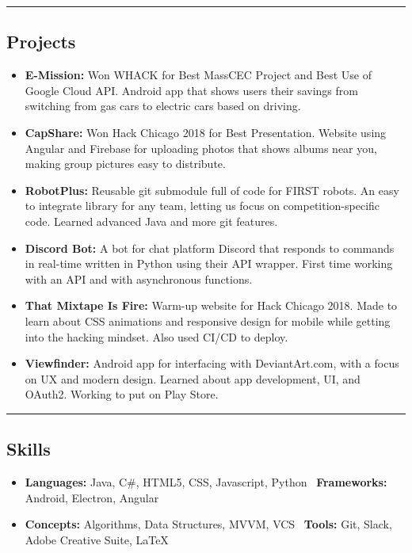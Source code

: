 \documentclass[11pt,letterpaper]{article}
\begin{document}
\hrule
\vspace{-0.4em}
\subsection*{Projects}

\begin{itemize}
	\parskip=0.1em
	
	\item \textbf{E-Mission:}
		Won WHACK for Best MassCEC Project and Best Use of Google Cloud API. Android app that shows users their savings from switching from gas cars to electric cars based on driving. 
	
	\item \textbf{CapShare:}
		Won Hack Chicago 2018 for Best Presentation. Website using Angular and Firebase for uploading photos that shows albums near you, making group pictures easy to distribute. 
		
	\item \textbf{RobotPlus:}
		Reusable git submodule full of code for FIRST robots. An easy to integrate library for any team, letting us focus on competition-specific code. Learned advanced Java and more git features. 
		
	\item \textbf{Discord Bot:}
		A bot for chat platform Discord that responds to commands in real-time written in Python using their API wrapper. First time working with an API and with asynchronous functions.
		
	\item \textbf{That Mixtape Is Fire:}
		Warm-up website for Hack Chicago 2018. Made to learn about CSS animations and responsive design for mobile while getting into the hacking mindset. Also used CI/CD to deploy. 
	
	\item \textbf{Viewfinder:}
		Android app for interfacing with DeviantArt.com, with a focus on UX and modern design.  Learned about app development, UI, and OAuth2. Working to put on Play Store.

\end{itemize}

\hrule
\vspace{-0.4em}
\subsection*{Skills}

\begin{itemize}
	\parskip=0.1em

	\item \textbf{Languages:} Java, C\#, HTML5, CSS, Javascript, Python \textbullet \ 
		\textbf{Frameworks:} Android, Electron, Angular %
	\item \textbf{Concepts:} Algorithms, Data Structures, MVVM, VCS \textbullet \ 
		\textbf{Tools:} Git, Slack, Adobe Creative Suite, \LaTeX
	
\end{itemize}
\end{document}

